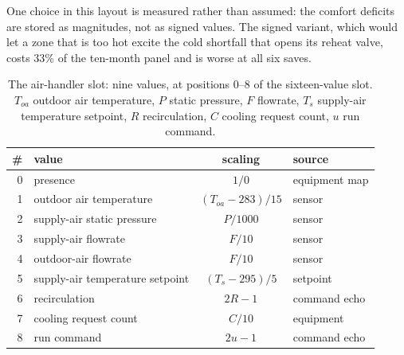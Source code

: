 \documentclass{article}
\begin{document}
One choice in this layout is measured rather than assumed: the comfort deficits are stored as magnitudes, not as signed values. The signed variant, which would let a zone that is too hot excite the cold shortfall that opens its reheat valve, costs 33\% of the ten-month panel and is worse at all six saves.

\begin{table}[h!]
\centering
\small
\begin{tabular}{@{}rlcl@{}}
\toprule
\# & value & scaling & source \\
\midrule
0 & presence & $1/0$ & equipment map \\
1 & outdoor air temperature & $(T_{oa}-283)/15$ & sensor \\
2 & supply-air static pressure & $P/1000$ & sensor \\
3 & supply-air flowrate & $F/10$ & sensor \\
4 & outdoor-air flowrate & $F/10$ & sensor \\
5 & supply-air temperature setpoint & $(T_s-295)/5$ & setpoint \\
6 & recirculation & $2R-1$ & command echo \\
7 & cooling request count & $C/10$ & equipment \\
8 & run command & $2u-1$ & command echo \\
\bottomrule
\end{tabular}
\vspace{4pt}
\caption{The air-handler slot: nine values, at positions 0--8 of the sixteen-value slot. $T_{oa}$ outdoor air temperature, $P$ static pressure, $F$ flowrate, $T_s$ supply-air temperature setpoint, $R$ recirculation, $C$ cooling request count, $u$ run command.}
\label{tab:app_ahu}
\end{table}
\end{document}
